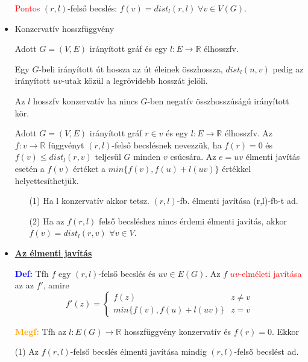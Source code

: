 \documentclass[../../szobeli.tex]{subfiles}
\begin{document}
\begin{itemize}
            \textcolor{red}{Pontos} $(r,l)$-felső becslés: $f(v) = dist_l(r,l)\; \forall v \in V(G)$.\
        
        \item Konzervatív hosszfüggvény
        
            Adott $G=(V,E)$ irányított gráf és egy $l:E \rightarrow \mathbb{R}$ élhosszfv. 
            
            Egy $G$-beli irányított út hossza az út éleinek összhossza, $dist_l(n,v)$ pedig az irányított $uv$-utak közül a legrövidebb hosszát jelöli. 

            Az $l$ hosszfv konzervatív ha nincs $G$-ben negatív összhosszúságú irányított kör. 
            
            Adott $G=(V,E)$ irányított gráf $r\in v$ és egy $l:E\rightarrow \mathbb{R}$ élhosszfv. Az $f:v \rightarrow \mathbb{R}$ függvényt $(r,l)$-felső becslésnek nevezzük, ha $f(r)=0$ és $f(v) \leq dist_l(r,v)$ teljesül $G$ minden $v$ csúcsára. Az $e=uv$ élmenti javítás esetén a $f(v)$ értéket a $min\{f(v),f(u)+l(uv)\}$ értékkel helyettesíthetjük. \begin{itemize}
                \item[(1)] Ha l konzervatív akkor tetsz. $(r,l)$-fb. élmenti javítása (r,l)-fb-t ad.
                \item[(2)] Ha az $f(r,l)$ felső becsléshez nincs érdemi élmenti javítás, akkor $f(v)=dist_l(r,v)$ $\forall v \in V$.
            \end{itemize}

        \item \underline{\textbf{Az élmenti javítás}}

            \textbf{\textcolor{blue}{Def:}} Tfh $f$ egy $(r,l)$-felső becslés és $uv \in E(G)$. Az $f$ \textcolor{red}{$uv$-elméleti javítása} az az $f'$, amire 
            \begin{equation*}
                f'(z) = \begin{cases}
                    f(z) & z \neq v \\
                    min\{f(v), f(u) + l(uv)\} & z = v
                \end{cases}
            \end{equation*}
        
            \textbf{\textcolor{orange}{Megf:}} Tfh az $l:E(G)\rightarrow \mathbb{R}$ hosszfüggvény konzervatív és $f(r) = 0$. Ekkor 
            
            (1) Az $f (r,l)$-felső becslés élmenti javítása mindig $(r,l)$-felső becslést ad.


\end{itemize}
\end{document}
